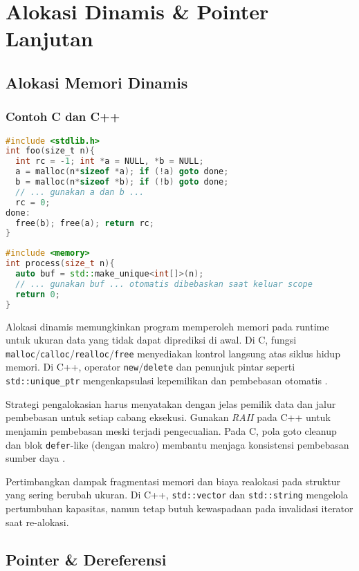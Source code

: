 \documentclass[../main.tex]{subfiles}
\begin{document}
\chapter{Alokasi Dinamis \& Pointer Lanjutan}
\section{Alokasi Memori Dinamis}
\subsection{Contoh C dan C++}
\begin{lstlisting}[language=C, caption={Pola cleanup bertahap di C}]
#include <stdlib.h>
int foo(size_t n){
  int rc = -1; int *a = NULL, *b = NULL;
  a = malloc(n*sizeof *a); if (!a) goto done;
  b = malloc(n*sizeof *b); if (!b) goto done;
  // ... gunakan a dan b ...
  rc = 0;
done:
  free(b); free(a); return rc;
}
\end{lstlisting}

\begin{lstlisting}[language=C++, caption={RAII dengan unique_ptr di C++}]
#include <memory>
int process(size_t n){
  auto buf = std::make_unique<int[]>(n);
  // ... gunakan buf ... otomatis dibebaskan saat keluar scope
  return 0;
}
\end{lstlisting}
Alokasi dinamis memungkinkan program memperoleh memori pada runtime untuk ukuran data yang tidak dapat diprediksi di awal. Di C, fungsi \texttt{malloc}/\texttt{calloc}/\texttt{realloc}/\texttt{free} menyediakan kontrol langsung atas siklus hidup memori. Di C++, operator \texttt{new}/\texttt{delete} dan penunjuk pintar seperti \texttt{std::unique\_ptr} mengenkapsulasi kepemilikan dan pembebasan otomatis \parencite{iso-c-draft-n1570,cpp-reference}.

Strategi pengalokasian harus menyatakan dengan jelas pemilik data dan jalur pembebasan untuk setiap cabang eksekusi. Gunakan \emph{RAII} pada C++ untuk menjamin pembebasan meski terjadi pengecualian. Pada C, pola goto cleanup dan blok \texttt{defer}-like (dengan makro) membantu menjaga konsistensi pembebasan sumber daya \parencite{gnu-c-manual}.

Pertimbangkan dampak fragmentasi memori dan biaya realokasi pada struktur yang sering berubah ukuran. Di C++, \texttt{std::vector} dan \texttt{std::string} mengelola pertumbuhan kapasitas, namun tetap butuh kewaspadaan pada invalidasi iterator saat re-alokasi.

\section{Pointer \& Dereferensi}
\end{document}
